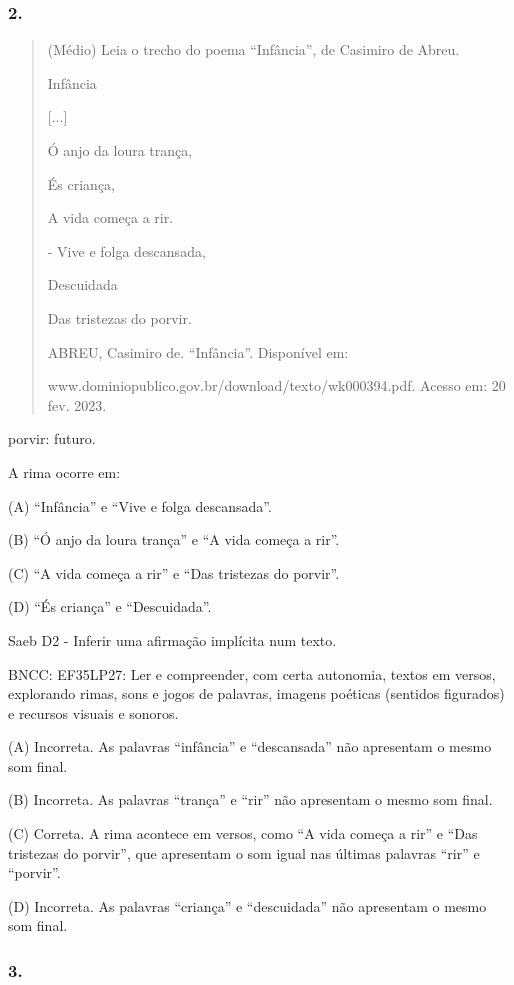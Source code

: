 \subsubsection{2. }\label{section-53}

\begin{quote}
(Médio) Leia o trecho do poema ``Infância'', de Casimiro de Abreu.

Infância

{[}...{]}

Ó anjo da loura trança,

És criança,

A vida começa a rir.

- Vive e folga descansada,

Descuidada

Das tristezas do porvir.

ABREU, Casimiro de. ``Infância''. Disponível em:

www.dominiopublico.gov.br/download/texto/wk000394.pdf. Acesso em: 20
fev. 2023.
\end{quote}

porvir: futuro.

A rima ocorre em:

(A) ``Infância'' e ``Vive e folga descansada''.

(B) ``Ó anjo da loura trança'' e ``A vida começa a rir''.

(C) ``A vida começa a rir'' e ``Das tristezas do porvir''.

(D) ``És criança'' e ``Descuidada''.

Saeb D2 - Inferir uma afirmação implícita num texto.

BNCC: EF35LP27: Ler e compreender, com certa autonomia, textos em
versos, explorando rimas, sons e jogos de palavras, imagens poéticas
(sentidos figurados) e recursos visuais e sonoros.

(A) Incorreta. As palavras ``infância'' e ``descansada'' não apresentam
o mesmo som final.

(B) Incorreta. As palavras ``trança'' e ``rir'' não apresentam o mesmo
som final.

(C) Correta. A rima acontece em versos, como ``A vida começa a rir'' e
``Das tristezas do porvir'', que apresentam o som igual nas últimas
palavras ``rir'' e ``porvir''.

(D) Incorreta. As palavras ``criança'' e ``descuidada'' não apresentam o
mesmo som final.

\subsubsection{3. }\label{section-54}

